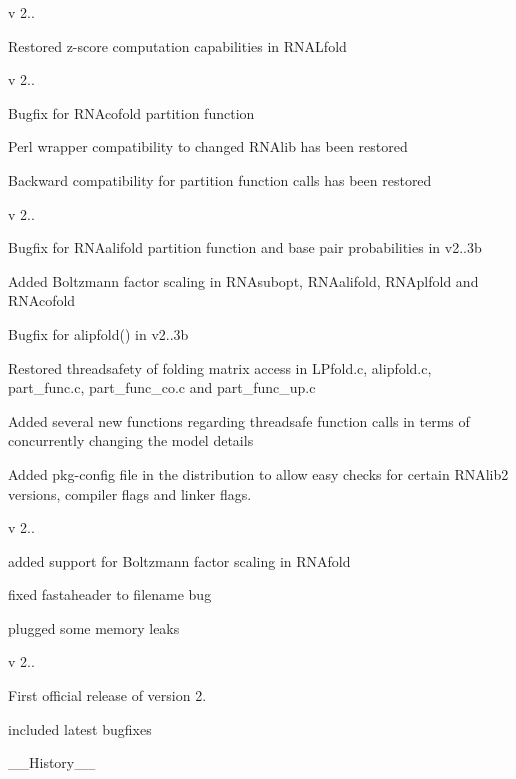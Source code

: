 v 2..
\begin{DoxyItemize}
\item Restored z-\/score computation capabilities in R\+N\+A\+Lfold
\end{DoxyItemize}

v 2..
\begin{DoxyItemize}
\item Bugfix for R\+N\+Acofold partition function
\item Perl wrapper compatibility to changed R\+N\+Alib has been restored
\item Backward compatibility for partition function calls has been restored
\end{DoxyItemize}

v 2..
\begin{DoxyItemize}
\item Bugfix for R\+N\+Aalifold partition function and base pair probabilities in v2..\+3b
\item Added Boltzmann factor scaling in R\+N\+Asubopt, R\+N\+Aalifold, R\+N\+Aplfold and R\+N\+Acofold
\item Bugfix for alipfold() in v2..\+3b
\item Restored threadsafety of folding matrix access in L\+Pfold.\+c, alipfold.\+c, part\+\_\+func.\+c, part\+\_\+func\+\_\+co.\+c and part\+\_\+func\+\_\+up.\+c
\item Added several new functions regarding threadsafe function calls in terms of concurrently changing the model details
\item Added pkg-\/config file in the distribution to allow easy checks for certain R\+N\+Alib2 versions, compiler flags and linker flags.
\end{DoxyItemize}

v 2..
\begin{DoxyItemize}
\item added support for Boltzmann factor scaling in R\+N\+Afold
\item fixed fastaheader to filename bug
\item plugged some memory leaks
\end{DoxyItemize}

v 2..
\begin{DoxyItemize}
\item First official release of version 2.
\item included latest bugfixes
\end{DoxyItemize}

\+\_\+\+\_\+\+History\+\_\+\+\_\+

